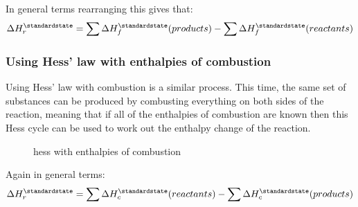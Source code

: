 In general terms rearranging this gives that:
\begin{equation}
	\Delta H^{\standardstate}_{r} = \sum \Delta H^{\standardstate}_{f} \textrm(products) - \sum \Delta H^{\standardstate}_{f} \textrm(reactants)
\end{equation}

\subsubsection{Using Hess' law with enthalpies of combustion}
Using Hess' law with combustion is a similar process. This time, the same set of substances can be produced by combusting everything on both sides of the reaction, meaning that if all of the enthalpies of combustion are known then this Hess cycle can be used to work out the enthalpy change of the reaction.
\begin{figure}[ht]
    \centering
    \caption{hess with enthalpies of combustion}
    \label{fig:hess-with-enthalpies-of-combustion}
\end{figure}

Again in general terms:
\begin{equation}
	\Delta H^{\standardstate}_{r} = \sum \Delta H^{\standardstate}_{c} \textrm(reactants) - \sum \Delta H^{\standardstate}_{c} \textrm(products)
\end{equation}
